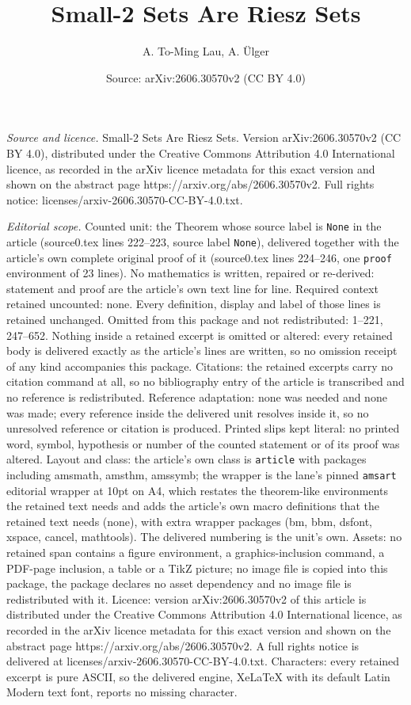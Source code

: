 \documentclass[10pt,a4paper]{amsart}
\title[Small-2 Sets Are Riesz Sets]{Small-2 Sets Are Riesz Sets}
\author{A. To-Ming Lau, A. \"Ulger}
\date{Source: arXiv:2606.30570v2 (CC BY 4.0)}
\begin{document}
\maketitle

\noindent\emph{Source and licence.} Small-2 Sets Are Riesz Sets. Version arXiv:2606.30570v2 (CC BY 4.0), distributed under the Creative Commons Attribution 4.0 International licence, as recorded in the arXiv licence metadata for this exact version and shown on the abstract page https://arxiv.org/abs/2606.30570v2. Full rights notice: licenses/arxiv-2606.30570-CC-BY-4.0.txt.\par\smallskip

\noindent\textit{Editorial scope.} Counted unit: the Theorem whose source label is \texttt{None} in the article (source0.tex lines 222--223, source label \texttt{None}), delivered together with the article's own complete original proof of it (source0.tex lines 224--246, one \texttt{proof} environment of 23 lines). No mathematics is written, repaired or re-derived: statement and proof are the article's own text line for line. Required context retained uncounted: none. Every definition, display and label of those lines is retained unchanged. Omitted from this package and not redistributed: 1--221, 247--652. Nothing inside a retained excerpt is omitted or altered: every retained body is delivered exactly as the article's lines are written, so no omission receipt of any kind accompanies this package. Citations: the retained excerpts carry no citation command at all, so no bibliography entry of the article is transcribed and no reference is redistributed. Reference adaptation: none was needed and none was made; every reference inside the delivered unit resolves inside it, so no unresolved reference or citation is produced. Printed slips kept literal: no printed word, symbol, hypothesis or number of the counted statement or of its proof was altered. Layout and class: the article's own class is \texttt{article} with packages including amsmath, amsthm, amssymb; the wrapper is the lane's pinned \texttt{amsart} editorial wrapper at 10pt on A4, which restates the theorem-like environments the retained text needs and adds the article's own macro definitions that the retained text needs (none), with extra wrapper packages (bm, bbm, dsfont, xspace, cancel, mathtools). The delivered numbering is the unit's own. Assets: no retained span contains a figure environment, a graphics-inclusion command, a PDF-page inclusion, a table or a TikZ picture; no image file is copied into this package, the package declares no asset dependency and no image file is redistributed with it. Licence: version arXiv:2606.30570v2 of this article is distributed under the Creative Commons Attribution 4.0 International licence, as recorded in the arXiv licence metadata for this exact version and shown on the abstract page https://arxiv.org/abs/2606.30570v2. A full rights notice is delivered at licenses/arxiv-2606.30570-CC-BY-4.0.txt. Characters: every retained excerpt is pure ASCII, so the delivered engine, XeLaTeX with its default Latin Modern text font, reports no missing character.
\end{document}
